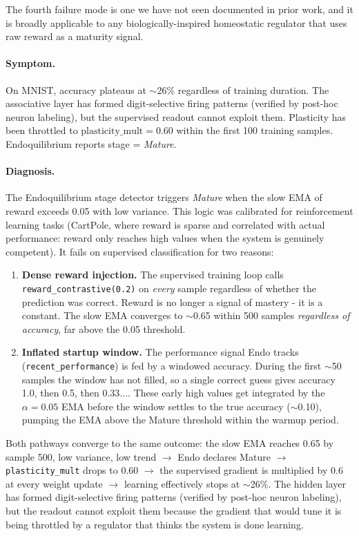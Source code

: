 The fourth failure mode is one we have not seen documented in prior work, and it is broadly applicable to any biologically-inspired homeostatic regulator that uses raw reward as a maturity signal.

\paragraph{Symptom.}
On MNIST, accuracy plateaus at $\sim$26\% regardless of training duration. The associative layer has formed digit-selective firing patterns (verified by post-hoc neuron labeling), but the supervised readout cannot exploit them. Plasticity has been throttled to $\text{plasticity\_mult}=0.60$ within the first 100 training samples. Endoquilibrium reports stage = \emph{Mature}.

\paragraph{Diagnosis.}
The Endoquilibrium stage detector triggers \emph{Mature} when the slow EMA of reward exceeds 0.05 with low variance. This logic was calibrated for reinforcement learning tasks (CartPole, where reward is sparse and correlated with actual performance: reward only reaches high values when the system is genuinely competent). It fails on supervised classification for two reasons:

\begin{enumerate}
  \item \textbf{Dense reward injection.} The supervised training loop calls \texttt{reward\_contrastive(0.2)} on \emph{every} sample regardless of whether the prediction was correct. Reward is no longer a signal of mastery - it is a constant. The slow EMA converges to $\sim$0.65 within 500 samples \emph{regardless of accuracy}, far above the 0.05 threshold.
  \item \textbf{Inflated startup window.} The performance signal Endo tracks (\texttt{recent\_performance}) is fed by a windowed accuracy. During the first $\sim$50 samples the window has not filled, so a single correct guess gives accuracy 1.0, then 0.5, then 0.33$\ldots$. These early high values get integrated by the $\alpha = 0.05$ EMA before the window settles to the true accuracy ($\sim$0.10), pumping the EMA above the Mature threshold within the warmup period.
\end{enumerate}

Both pathways converge to the same outcome: the slow EMA reaches 0.65 by sample 500, low variance, low trend $\to$ Endo declares Mature $\to$ \texttt{plasticity\_mult} drops to 0.60 $\to$ the supervised gradient is multiplied by 0.6 at every weight update $\to$ learning effectively stops at $\sim$26\%. The hidden layer has formed digit-selective firing patterns (verified by post-hoc neuron labeling), but the readout cannot exploit them because the gradient that would tune it is being throttled by a regulator that thinks the system is done learning.

